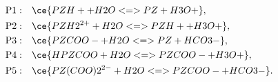 \begin{equation}
\begin{aligned}
 \mathrm{P1:}\quad &\ce{PZH+ + H2O <=> PZ + H3O+},\\
 \mathrm{P2:}\quad &\ce{PZH2^{2+} + H2O <=> PZH+ + H3O+},\\
 \mathrm{P3:}\quad &\ce{PZCOO- + H2O <=> PZ + HCO3-},\\
 \mathrm{P4:}\quad &\ce{HPZCOO + H2O <=> PZCOO- + H3O+},\\
 \mathrm{P5:}\quad &\ce{PZ(COO)2^{2-} + H2O <=> PZCOO- + HCO3-}.
\end{aligned}
\end{equation}
